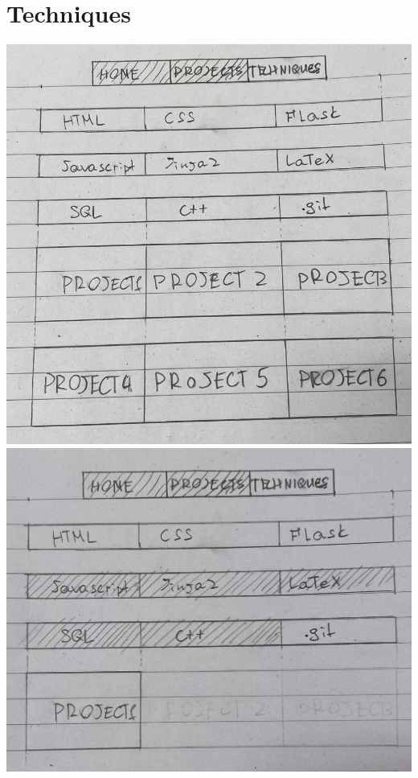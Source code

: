 \documentclass{TDP003mall}
\begin{document}
\section{Techniques}

\begin{center}
\includegraphics[scale=0.25]{Tech1.jpg}
\includegraphics[scale=0.25]{Tech2.jpg}
\end{center}
\end{document}
